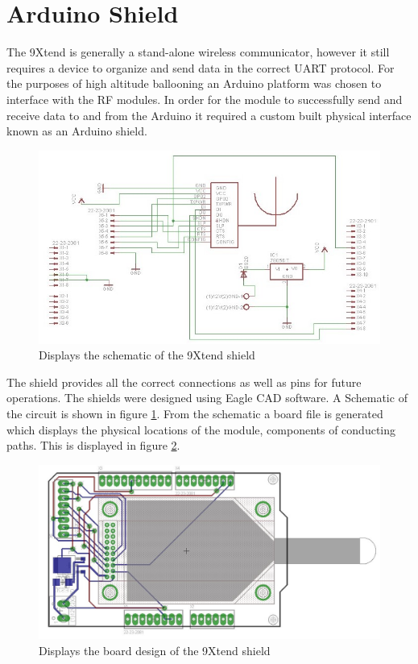\documentclass[paper=a4, fontsize=11pt]{scrartcl}
\numberwithin{equation}{section}		%
\numberwithin{figure}{section}			%
\numberwithin{table}{section}				%
\begin{document}
\section{Arduino Shield}

The 9Xtend is generally a stand-alone wireless communicator, however it still requires a device to organize and send data in the correct UART protocol. For the purposes of high altitude ballooning an Arduino platform was chosen to interface with the RF modules. In order for the module to successfully send and receive data to and from the Arduino it required a custom built physical interface known as an Arduino shield. 
\begin{figure}[H]
\centering
\includegraphics[width=0.9\linewidth]{sch}
\caption{ Displays the schematic of the 9Xtend shield}
\label{sch}
\end{figure}

The shield provides all the correct connections as well as pins for future operations. The shields were designed using Eagle CAD software. A Schematic of the circuit is shown in figure \ref{sch}. From the schematic a board file is generated which displays the physical locations of the module, components of conducting paths. This is displayed in figure \ref{brd}.

\begin{figure}[H]
\centering
\includegraphics[width=0.9\linewidth]{brd}
\caption{ Displays the board design of the 9Xtend shield}
\label{brd}
\end{figure}
\end{document}
